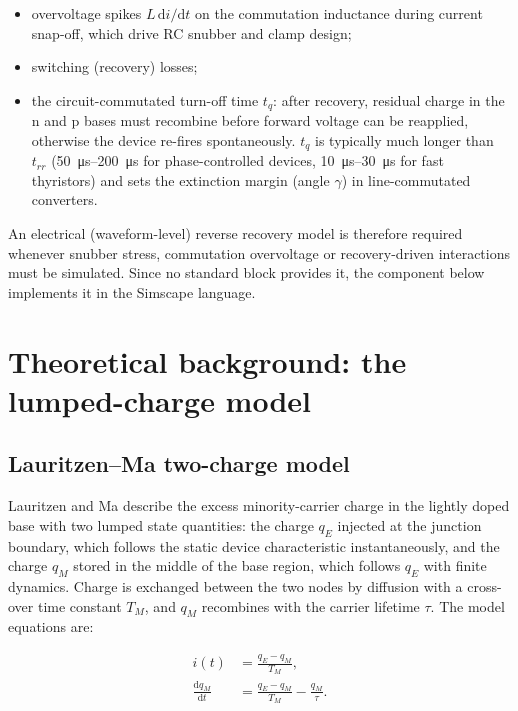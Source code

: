 \documentclass[11pt,a4paper]{article}
\begin{document}
\begin{itemize}
  \item overvoltage spikes $L\,\mathrm{d}i/\mathrm{d}t$ on the commutation
        inductance during current snap-off, which drive RC snubber and clamp
        design;
  \item switching (recovery) losses;
  \item the circuit-commutated turn-off time $t_q$: after recovery, residual
        charge in the n and p bases must recombine before forward voltage can
        be reapplied, otherwise the device re-fires spontaneously. $t_q$ is
        typically much longer than $t_{rr}$ (\SIrange{50}{200}{\micro\second}
        for phase-controlled devices, \SIrange{10}{30}{\micro\second} for fast
        thyristors) and sets the extinction margin (angle $\gamma$) in
        line-commutated converters.
\end{itemize}

An electrical (waveform-level) reverse recovery model is therefore required
whenever snubber stress, commutation overvoltage or recovery-driven
interactions must be simulated. Since no standard block provides it, the
component below implements it in the Simscape language.

\section{Theoretical background: the lumped-charge model}

\subsection{Lauritzen--Ma two-charge model}

Lauritzen and Ma \cite{lauritzen1991} describe the excess minority-carrier
charge in the lightly doped base with two lumped state quantities: the charge
$q_E$ injected at the junction boundary, which follows the static device
characteristic instantaneously, and the charge $q_M$ stored in the middle of
the base region, which follows $q_E$ with finite dynamics. Charge is exchanged
between the two nodes by diffusion with a cross-over time constant $T_M$, and
$q_M$ recombines with the carrier lifetime $\tau$. The model equations are:

\begin{align}
  i(t)                          &= \frac{q_E - q_M}{T_M}, \label{eq:current}\\
  \frac{\mathrm{d}q_M}{\mathrm{d}t} &= \frac{q_E - q_M}{T_M} - \frac{q_M}{\tau}. \label{eq:charge}
\end{align}
\end{document}
